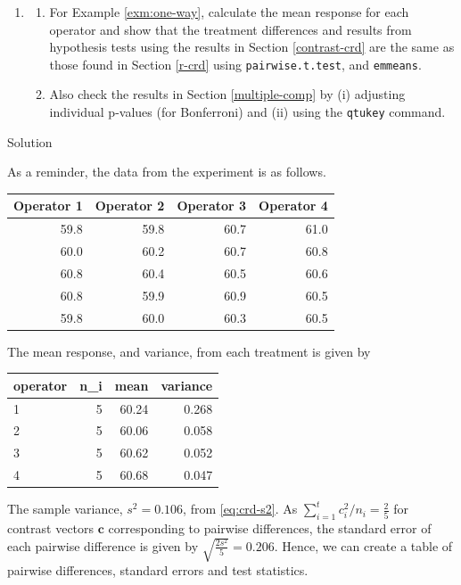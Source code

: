 \documentclass[
]{book}
\theoremstyle{definition}
\theoremstyle{definition}
\theoremstyle{definition}
\theoremstyle{definition}
\theoremstyle{remark}
\begin{document}
\begin{enumerate}
\def\labelenumi{\arabic{enumi}.}
\item
  \begin{enumerate}
  \def\labelenumii{\alph{enumii}.}
  \item
    For Example \ref{exm:one-way}, calculate the mean response for each operator and show that the treatment differences and results from hypothesis tests using the results in Section \ref{contrast-crd} are the same as those found in Section \ref{r-crd} using \texttt{pairwise.t.test}, and \texttt{emmeans}.
  \item
    Also check the results in Section \ref{multiple-comp} by (i) adjusting individual p-values (for Bonferroni) and (ii) using the \texttt{qtukey} command.
  \end{enumerate}
\end{enumerate}

Solution

As a reminder, the data from the experiment is as follows.

\begin{tabular}{r|r|r|r}
\hline
Operator 1 & Operator 2 & Operator 3 & Operator 4\\
\hline
59.8 & 59.8 & 60.7 & 61.0\\
\hline
60.0 & 60.2 & 60.7 & 60.8\\
\hline
60.8 & 60.4 & 60.5 & 60.6\\
\hline
60.8 & 59.9 & 60.9 & 60.5\\
\hline
59.8 & 60.0 & 60.3 & 60.5\\
\hline
\end{tabular}

The mean response, and variance, from each treatment is given by

\begin{tabular}{l|r|r|r}
\hline
operator & n\_i & mean & variance\\
\hline
1 & 5 & 60.24 & 0.268\\
\hline
2 & 5 & 60.06 & 0.058\\
\hline
3 & 5 & 60.62 & 0.052\\
\hline
4 & 5 & 60.68 & 0.047\\
\hline
\end{tabular}

The sample variance, \(s^2 = 0.106\), from \eqref{eq:crd-s2}. As \(\sum_{i=1}^tc_i^2/n_i = \frac{2}{5}\) for contrast vectors \(\boldsymbol{c}\) corresponding to pairwise differences, the standard error of each pairwise difference is given by \(\sqrt{\frac{2s^2}{5}} = 0.206\). Hence, we can create a table of pairwise differences, standard errors and test statistics.
\end{document}
